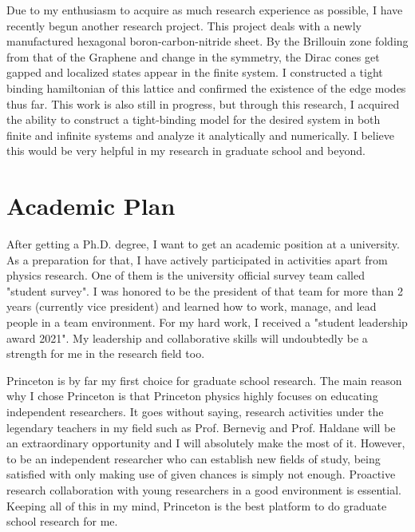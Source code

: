\documentclass[a4]{article}
\begin{document}
Due to my enthusiasm to acquire as much research experience as possible, I have recently begun another research project. This project deals with a newly manufactured hexagonal boron-carbon-nitride sheet. By the Brillouin zone folding from that of the Graphene and change in the symmetry, the Dirac cones get gapped and localized states appear in the finite system. I constructed a tight binding hamiltonian of this lattice and confirmed the existence of the edge modes thus far. This work is also still in progress, but through this research, I acquired the ability to construct a tight-binding model for the desired system in both finite and infinite systems and analyze it analytically and numerically. I believe this would be very helpful in my research in graduate school and beyond.\par


\section{Academic Plan}
After getting a Ph.D. degree, I want to get an academic position at a university. As a preparation for that, I have actively participated in activities apart from physics research. One of them is the university official survey team called "student survey". I was honored to be the president of that team for more than 2 years (currently vice president) and learned how to work, manage, and lead people in a team environment. For my hard work, I received a "student leadership award 2021". My leadership and collaborative skills will undoubtedly be a strength for me in the research field too.\par

Princeton is by far my first choice for graduate school research. The main reason why I chose Princeton is that Princeton physics highly focuses on educating independent researchers. It goes without saying, research activities under the legendary teachers in my field such as Prof. Bernevig and Prof. Haldane will be an extraordinary opportunity and I will absolutely make the most of it. However, to be an independent researcher who can establish new fields of study, being satisfied with only making use of given chances is simply not enough. Proactive research collaboration with young researchers in a good environment is essential. Keeping all of this in my mind, Princeton is the best platform to do graduate school research for me.
\end{document}
